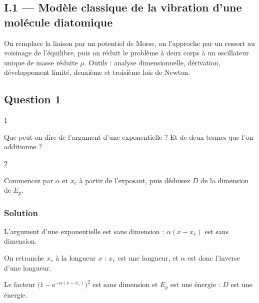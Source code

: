 \documentclass[11pt,a4paper]{article}
\newcommand{\equationajustee}[1]{%
  \sbox{\boiteequation}{$\displaystyle #1$}%
  \ifdim\wd\boiteequation>\linewidth
    \[\resizebox{\linewidth}{!}{\usebox{\boiteequation}}\]%
  \else
    \[#1\]%
  \fi}
\begin{document}
\hypertarget{i.1-moduxe8le-classique-de-la-vibration-dune-moluxe9cule-diatomique}{%
\subsection{I.1 --- Modèle classique de la vibration d'une molécule diatomique}\label{i.1-moduxe8le-classique-de-la-vibration-dune-moluxe9cule-diatomique}}

On remplace la liaison par un potentiel de Morse, on l'approche par un ressort au voisinage de l'équilibre, puis on réduit le problème à deux corps à un oscillateur unique de masse réduite \(\mu\). Outils : analyse dimensionnelle, dérivation, développement limité, deuxième et troisième lois de Newton.

\hypertarget{question-1}{%
\subsection{Question 1}\label{question-1}}

\begin{indication}{1}

Que peut-on dire de l'argument d'une exponentielle ? Et de deux termes que l'on additionne ?

\end{indication}

\begin{indication}{2}

Commencez par \(\alpha\) et \(x_e\) à partir de l'exposant, puis déduisez \(D\) de la dimension de \(E_p\).

\end{indication}

\hypertarget{solution}{%
\subsubsection{Solution}\label{solution}}

L'argument d'une exponentielle est sans dimension : \(\alpha(x - x_e)\) est sans dimension.

On retranche \(x_e\) à la longueur \(x\) : \(x_e\) est une longueur, et \(\alpha\) est donc l'inverse d'une longueur.

Le facteur \(\bigl(1 - {\mathrm{e}}^{-\alpha(x - x_e)}\bigr)^2\) est sans dimension et \(E_p\) est une énergie : \(D\) est une énergie.

\equationajustee{\boxed{\begin{aligned}{}&D\ \text{en J}\ (\mathrm{kg\,m^2\,s^{-2}}) \\
&\alpha\ \text{en}\ \mathrm{m^{-1}} \\
&x_e\ \text{en m}
\end{aligned}}}
\end{document}
